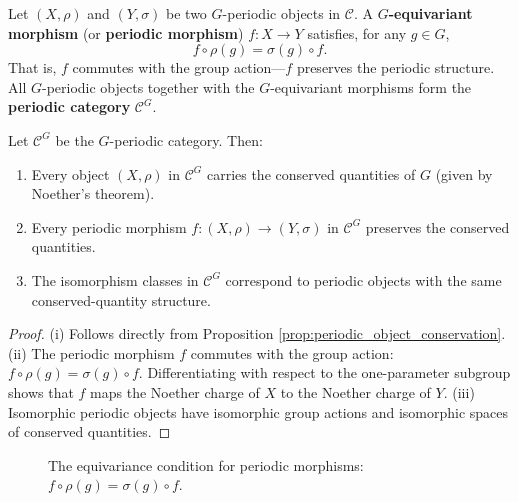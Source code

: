 \begin{definition}\label{def:periodic_morphism}
Let $(X, \rho)$ and $(Y, \sigma)$ be two $G$-periodic objects in $\mathcal{C}$. A \textbf{$G$-equivariant morphism} (or \textbf{periodic morphism}) $f: X \to Y$ satisfies, for any $g \in G$,
\[
f \circ \rho(g) = \sigma(g) \circ f.
\]
That is, $f$ commutes with the group action---$f$ preserves the periodic structure. All $G$-periodic objects together with the $G$-equivariant morphisms form the \textbf{periodic category} $\mathcal{C}^G$.
\end{definition}

\begin{theorem}\label{thm:periodic_category_conservation}
Let $\mathcal{C}^G$ be the $G$-periodic category. Then:
\begin{enumerate}[label=(\roman*)]
    \item Every object $(X, \rho)$ in $\mathcal{C}^G$ carries the conserved quantities of $G$ (given by Noether's theorem).
    \item Every periodic morphism $f: (X, \rho) \to (Y, \sigma)$ in $\mathcal{C}^G$ preserves the conserved quantities.
    \item The isomorphism classes in $\mathcal{C}^G$ correspond to periodic objects with the same conserved-quantity structure.
\end{enumerate}
\end{theorem}

\begin{proof}
(i) Follows directly from Proposition \ref{prop:periodic_object_conservation}. (ii) The periodic morphism $f$ commutes with the group action: $f \circ \rho(g) = \sigma(g) \circ f$. Differentiating with respect to the one-parameter subgroup shows that $f$ maps the Noether charge of $X$ to the Noether charge of $Y$. (iii) Isomorphic periodic objects have isomorphic group actions and isomorphic spaces of conserved quantities.
\end{proof}

\begin{figure}[htbp]
\centering
{}
\caption{The equivariance condition for periodic morphisms: $f\circ\rho(g)=\sigma(g)\circ f$.}
\label{fig:periodic_morphism}
\end{figure}

